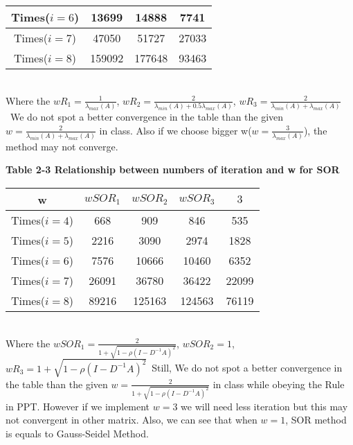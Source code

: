 \documentclass[12pt]{amsart}
\numberwithin{equation}{section}
\numberwithin{table}{section}
\numberwithin{figure}{section}
\numberwithin{algorithm}{section}
\begin{document}
\begin{enumerate}
\begin{tabular}{|c|c|c|c|}
\hline
Times($i=6$)&13699&14888&7741\\
\hline
Times($i=7$)&47050&51727&27033\\
\hline
Times($i=8$)&159092&177648&93463\\
\hline
\end{tabular}
\\
Where the $wR_{1}=\frac{1}{\lambda_{max}(A)}$, $wR_{2}=\frac{2}{\lambda_{min}(A)+0.5\lambda_{max}(A)}$, $wR_{3}=\frac{2}{\lambda_{min}(A)+\lambda_{max}(A)}$\
We do not spot a better convergence in the table than the given $w=\frac{2}{\lambda_{min}(A)+\lambda_{max}(A)}$	in class. Also if we choose bigger w($w=\frac{3}{\lambda_{max}(A)}$), the method may not converge.\\
\begin{center}
\bf{Table 2-3 Relationship between numbers of iteration and w for SOR}
\end{center}
\begin{tabular}{|c|c|c|c|c|}
\hline
w&$wSOR_1$&$wSOR_2$&$wSOR_3$&$3$\\
\hline
Times($i=4$)&668&909&846&535\\
\hline
Times($i=5$)&2216&3090&2974&1828\\
\hline
Times($i=6$)&7576&10666&10460&6352\\
\hline
Times($i=7$)&26091&36780&36422&22099\\
\hline
Times($i=8$)&89216&125163&124563&76119\\
\hline
\end{tabular}
\\
Where the $wSOR_{1}=\frac{2}{1+\sqrt{1-\rho(I-D^{-1}A)^2}}$, $wSOR_{2}=1$, $wR_{3}=1+\sqrt{1-\rho(I-D^{-1}A)^2}$\
Still, We do not spot a better convergence in the table than the given $w=\frac{2}{1+\sqrt{1-\rho(I-D^{-1}A)^2}}$ in class while obeying the Rule in PPT. However if we implement $w=3$ we will need less iteration but this may not convergent in other matrix. Also, we can see that when $w=1$, SOR method is equals to Gauss-Seidel Method.\\


\end{enumerate}
\end{document}
